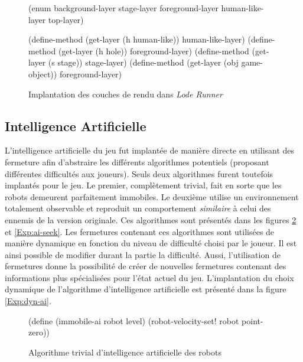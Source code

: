 \documentclass[12pt,twoside,letterpaper,francais]{book}
\newcommand{\lr}{{\textit{Lode Runner }}}
\begin{document}
\begin{figure}[htb!]
  \begin{schemecode}
(enum background-layer stage-layer foreground-layer 
      human-like-layer top-layer)

(define-method (get-layer (h human-like))    human-like-layer)
(define-method (get-layer (h hole))          foreground-layer)
(define-method (get-layer (s stage))         stage-layer)
(define-method (get-layer (obj game-object)) foreground-layer)
  \end{schemecode}
  \caption{Implantation des couches de rendu dans \lr}
  \label{Exp:layers}
\end{figure}


\FloatBarrier
\subsection{Intelligence Artificielle}
L'intelligence artificielle du jeu fut implantée de manière directe en
utilisant des fermeture afin d'abstraire les différents algorithmes
potentiels (proposant différentes difficultés aux joueurs). Seuls deux
algorithmes furent toutefois implantés pour le jeu. Le premier,
complètement trivial, fait en sorte que les robots demeurent
parfaitement immobiles.  Le deuxième utilise un environnement
totalement observable et reproduit un comportement \emph{similaire} à
celui des ennemis de la version originale. Ces algorithmes sont
présentés dans les figures \ref{Exp:ai-imm} et \ref{Exp:ai-seek}. Les
fermetures contenant ces algorithmes sont utilisées de manière
dynamique en fonction du niveau de difficulté choisi par le joueur. Il
est ainsi possible de modifier durant la partie la difficulté. Aussi,
l'utilisation de fermetures donne la possibilité de créer de nouvelles
fermetures contenant des informations plus spécialisées pour l'état
actuel du jeu. L'implantation du choix dynamique de l'algorithme
d'intelligence artificielle est présenté dans la figure
\ref{Exp:dyn-ai}.\\

\begin{figure}[htb!]
  \begin{schemecode}
(define (immobile-ai robot level)
  (robot-velocity-set! robot point-zero))
  \end{schemecode}
  \caption{Algorithme trivial d'intelligence artificielle des robots}
  \label{Exp:ai-imm}
\end{figure}
\end{document}
